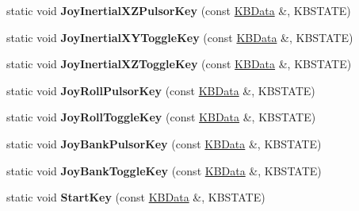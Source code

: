\begin{DoxyCompactItemize}
\item 
static void {\bfseries Joy\+Inertial\+X\+Z\+Pulsor\+Key} (const \hyperlink{classKBData}{K\+B\+Data} \&, K\+B\+S\+T\+A\+TE)\hypertarget{classFlyByKeyboard_a045d05e2c2bbe5938ccb526d7ba04197}{}\label{classFlyByKeyboard_a045d05e2c2bbe5938ccb526d7ba04197}

\item 
static void {\bfseries Joy\+Inertial\+X\+Y\+Toggle\+Key} (const \hyperlink{classKBData}{K\+B\+Data} \&, K\+B\+S\+T\+A\+TE)\hypertarget{classFlyByKeyboard_acb5b6faccaab47e079c6dc93f847e25d}{}\label{classFlyByKeyboard_acb5b6faccaab47e079c6dc93f847e25d}

\item 
static void {\bfseries Joy\+Inertial\+X\+Z\+Toggle\+Key} (const \hyperlink{classKBData}{K\+B\+Data} \&, K\+B\+S\+T\+A\+TE)\hypertarget{classFlyByKeyboard_a7da25c34b78ff4d8c6a3b4cbff0375d5}{}\label{classFlyByKeyboard_a7da25c34b78ff4d8c6a3b4cbff0375d5}

\item 
static void {\bfseries Joy\+Roll\+Pulsor\+Key} (const \hyperlink{classKBData}{K\+B\+Data} \&, K\+B\+S\+T\+A\+TE)\hypertarget{classFlyByKeyboard_a6c423922d7f6a473635d370cbbbed401}{}\label{classFlyByKeyboard_a6c423922d7f6a473635d370cbbbed401}

\item 
static void {\bfseries Joy\+Roll\+Toggle\+Key} (const \hyperlink{classKBData}{K\+B\+Data} \&, K\+B\+S\+T\+A\+TE)\hypertarget{classFlyByKeyboard_a37e95d2f7a9e02ba40fa96a86cf21c24}{}\label{classFlyByKeyboard_a37e95d2f7a9e02ba40fa96a86cf21c24}

\item 
static void {\bfseries Joy\+Bank\+Pulsor\+Key} (const \hyperlink{classKBData}{K\+B\+Data} \&, K\+B\+S\+T\+A\+TE)\hypertarget{classFlyByKeyboard_ab77c8417f859e03ad0947fa4be56bb1a}{}\label{classFlyByKeyboard_ab77c8417f859e03ad0947fa4be56bb1a}

\item 
static void {\bfseries Joy\+Bank\+Toggle\+Key} (const \hyperlink{classKBData}{K\+B\+Data} \&, K\+B\+S\+T\+A\+TE)\hypertarget{classFlyByKeyboard_a036ba02f1864e5408c5a3dd2b50f5ca3}{}\label{classFlyByKeyboard_a036ba02f1864e5408c5a3dd2b50f5ca3}

\item 
static void {\bfseries Start\+Key} (const \hyperlink{classKBData}{K\+B\+Data} \&, K\+B\+S\+T\+A\+TE)\hypertarget{classFlyByKeyboard_acd605fc34e6693843f7e6d5adb41fca9}{}\label{classFlyByKeyboard_acd605fc34e6693843f7e6d5adb41fca9}


\end{DoxyCompactItemize}
